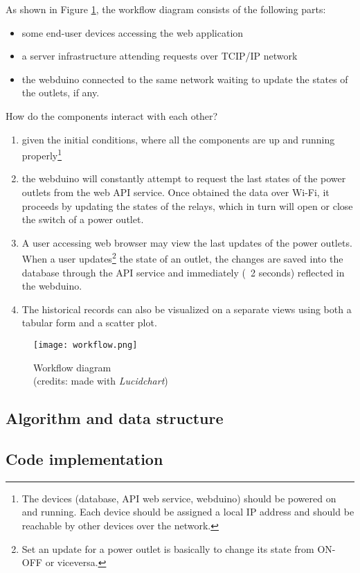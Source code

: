 As shown in Figure \ref{fig:workflow-diagram}, the workflow diagram consists of the following parts:
\begin{itemize}
    \item some end-user devices accessing the web application
    \item a server infrastructure attending requests over TCIP/IP network
    \item the webduino connected to the same network waiting to update the states of the outlets, if any.
\end{itemize}

\noindent
How do the components interact with each other?
\begin{enumerate}
    \item given the initial conditions, where all the components are up and running properly\footnote{The devices (database, API web service, webduino) should be powered on and running. Each device should be assigned a local IP address and should be reachable by other devices over the network.}
    \item the webduino will constantly attempt to request the last states of the power outlets from the web API service. Once obtained the data over Wi-Fi, it proceeds by updating the states of the relays, which in turn will open or close the switch of a power outlet.
    \item A user accessing web browser may view the last updates of the power outlets. When a user updates\footnote{Set an update for a power outlet is basically to change its state from ON-OFF or viceversa.} the state of an outlet, the changes are saved into the database through the API service and immediately (~2 seconds) reflected in the webduino.
    \item The historical records can also be visualized on a separate views using both a tabular form and a scatter plot.
\end{enumerate}

\begin{figure}[!ht]
    \centering
    \texttt{[image: workflow.png]}
    \caption{Workflow diagram \\ (credits: made with \emph{Lucidchart})}
    \label{fig:workflow-diagram}
\end{figure}

\subsection{Algorithm and data structure}

\subsection{Code implementation}
